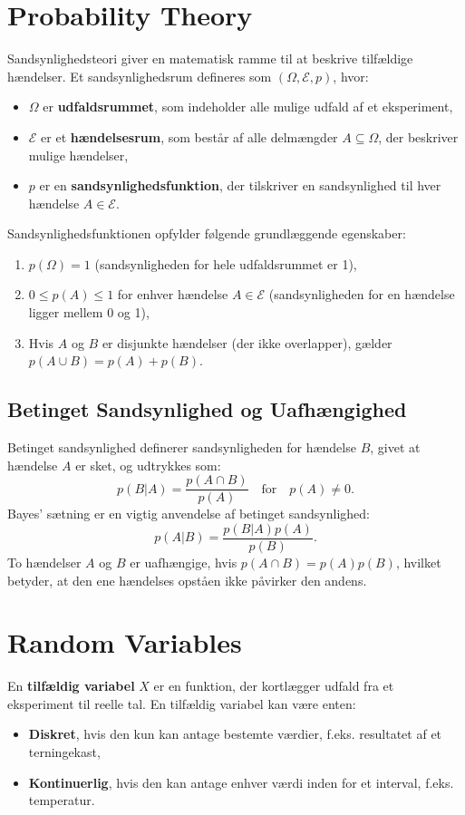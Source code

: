 \documentclass[a4paper,12pt]{book}
\begin{document}
	\section{Probability Theory}
	Sandsynlighedsteori giver en matematisk ramme til at beskrive tilfældige hændelser. Et sandsynlighedsrum defineres som \((\Omega, \mathcal{E}, p)\), hvor:
	\begin{itemize}
		\item \( \Omega \) er \textbf{udfaldsrummet}, som indeholder alle mulige udfald af et eksperiment,
		\item \( \mathcal{E} \) er et \textbf{hændelsesrum}, som består af alle delmængder \( A \subseteq \Omega \), der beskriver mulige hændelser,
		\item \( p \) er en \textbf{sandsynlighedsfunktion}, der tilskriver en sandsynlighed til hver hændelse \( A \in \mathcal{E} \).
	\end{itemize}
	Sandsynlighedsfunktionen opfylder følgende grundlæggende egenskaber:
	\begin{enumerate}
		\item \( p(\Omega) = 1 \) (sandsynligheden for hele udfaldsrummet er 1),
		\item \( 0 \leq p(A) \leq 1 \) for enhver hændelse \( A \in \mathcal{E} \) (sandsynligheden for en hændelse ligger mellem 0 og 1),
		\item Hvis \( A \) og \( B \) er disjunkte hændelser (der ikke overlapper), gælder \( p(A \cup B) = p(A) + p(B) \).
	\end{enumerate}
	
	\subsection{Betinget Sandsynlighed og Uafhængighed}
	Betinget sandsynlighed definerer sandsynligheden for hændelse \( B \), givet at hændelse \( A \) er sket, og udtrykkes som:
	\[
	p(B | A) = \frac{p(A \cap B)}{p(A)} \quad \text{for} \quad p(A) \neq 0.
	\]
	Bayes' sætning er en vigtig anvendelse af betinget sandsynlighed:
	\[
	p(A | B) = \frac{p(B | A)p(A)}{p(B)}.
	\]
	To hændelser \( A \) og \( B \) er uafhængige, hvis \( p(A \cap B) = p(A)p(B) \), hvilket betyder, at den ene hændelses opståen ikke påvirker den andens.
	
	\section{Random Variables}
	En \textbf{tilfældig variabel} \( X \) er en funktion, der kortlægger udfald fra et eksperiment til reelle tal. En tilfældig variabel kan være enten:
	\begin{itemize}
		\item \textbf{Diskret}, hvis den kun kan antage bestemte værdier, f.eks. resultatet af et terningekast,
		\item \textbf{Kontinuerlig}, hvis den kan antage enhver værdi inden for et interval, f.eks. temperatur.
	\end{itemize}
	
\end{document}
